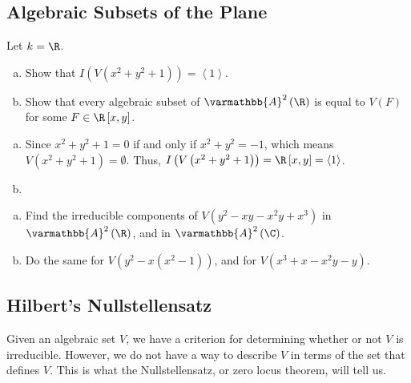\documentclass[10pt]{mypackage}
\renewcommand*{\mathbb}[1]{\varmathbb{#1}}
\newcommand{\A}{\mathbb{A}}
\begin{document}
\subsection{Algebraic Subsets of the Plane}%
\begin{exercise}[Exercise 1.30]
Let $k = \R$. 
\begin{enumerate}[(a)]
  \item Show that $I\left(V\left(x^2 + y^2 + 1\right)\right) = \left\langle 1 \right\rangle$.
  \item Show that every algebraic subset of $\A^2\left(\R\right)$ is equal to $V(F)$ for some $F\in \R\left[x,y\right]$.
\end{enumerate}
\end{exercise}
\begin{solution}\hfill
  \begin{enumerate}[(a)]
    \item Since $x^2 + y^2 + 1 = 0$ if and only if $x^2 + y^2 = -1$, which means $V\left(x^2 + y^2 + 1\right) = \emptyset$. Thus, $I\left( V\left( x^2 + y^2 + 1 \right) \right) = \R\left[ x,y \right] = \left\langle 1 \right\rangle$.
    \item \color{red}{Consult Brown.}
  \end{enumerate}
\end{solution}

\begin{exercise}[Exercise 1.31]\hfill
  \begin{enumerate}[(a)]
    \item Find the irreducible components of $V\left( y^2 - xy - x^2y + x^3 \right)$ in $\A^2\left( \R \right)$, and in $\A^2\left( \C \right)$.
    \item Do the same for $V\left( y^2 - x\left( x^2 - 1 \right) \right)$, and for $V\left( x^3 + x - x^2 y - y \right)$.
  \end{enumerate}
\end{exercise}
\subsection{Hilbert's Nullstellensatz}%
Given an algebraic set $V$, we have a criterion for determining whether or not $V$ is irreducible. However, we do not have a way to describe $V$ in terms of the set that defines $V$. This is what the Nullstellensatz, or zero locus theorem, will tell us.\newline
\end{document}
